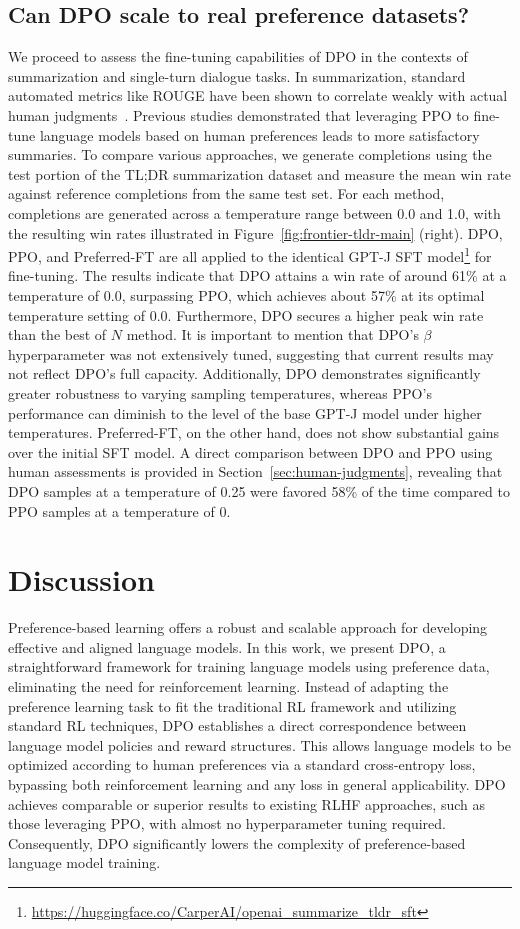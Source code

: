 \subsection{Can DPO scale to real preference datasets?}
\label{sec:dpo-real-datasets}
We proceed to assess the fine-tuning capabilities of DPO in the contexts of summarization and single-turn dialogue tasks. In summarization, standard automated metrics like ROUGE have been shown to correlate weakly with actual human judgments~\citep{stiennon2022learning}. Previous studies demonstrated that leveraging PPO to fine-tune language models based on human preferences leads to more satisfactory summaries. To compare various approaches, we generate completions using the test portion of the TL;DR summarization dataset and measure the mean win rate against reference completions from the same test set. For each method, completions are generated across a temperature range between 0.0 and 1.0, with the resulting win rates illustrated in Figure~\ref{fig:frontier-tldr-main} (right). DPO, PPO, and Preferred-FT are all applied to the identical GPT-J SFT model\footnote{\url{https://huggingface.co/CarperAI/openai_summarize_tldr_sft}} for fine-tuning. The results indicate that DPO attains a win rate of around 61\% at a temperature of 0.0, surpassing PPO, which achieves about 57\% at its optimal temperature setting of 0.0. Furthermore, DPO secures a higher peak win rate than the best of $N$ method. It is important to mention that DPO’s $\beta$ hyperparameter was not extensively tuned, suggesting that current results may not reflect DPO’s full capacity. Additionally, DPO demonstrates significantly greater robustness to varying sampling temperatures, whereas PPO’s performance can diminish to the level of the base GPT-J model under higher temperatures. Preferred-FT, on the other hand, does not show substantial gains over the initial SFT model. A direct comparison between DPO and PPO using human assessments is provided in Section~\ref{sec:human-judgments}, revealing that DPO samples at a temperature of 0.25 were favored 58\% of the time compared to PPO samples at a temperature of 0.

\section{Discussion}
Preference-based learning offers a robust and scalable approach for developing effective and aligned language models. In this work, we present DPO, a straightforward framework for training language models using preference data, eliminating the need for reinforcement learning. Instead of adapting the preference learning task to fit the traditional RL framework and utilizing standard RL techniques, DPO establishes a direct correspondence between language model policies and reward structures. This allows language models to be optimized according to human preferences via a standard cross-entropy loss, bypassing both reinforcement learning and any loss in general applicability. DPO achieves comparable or superior results to existing RLHF approaches, such as those leveraging PPO, with almost no hyperparameter tuning required. Consequently, DPO significantly lowers the complexity of preference-based language model training.

